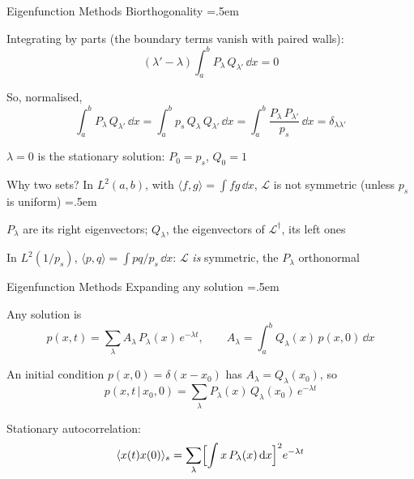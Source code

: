 \documentclass[xcolor={dvipsnames},t]{beamer}
\let\olditemize=\itemize
\let\endolditemize=\enditemize
\renewenvironment{itemize}{\olditemize \itemsep=.5em }{\endolditemize}
\newcommand{\gv}{\,|\,}
\newcommand{\Lop}{\mathcal{L}}
\begin{document}
\begin{frame}{Eigenfunction Methods}
    \alert{Biorthogonality}
    \begin{itemize}
        \item<2-> Integrating by parts (the boundary terms vanish with paired walls):
        \[ (\lambda'-\lambda)\int_a^b P_\lambda\,Q_{\lambda'}\,\dd x = 0 \]
        \item<3-> So, normalised,
        \[ \int_a^b P_\lambda\,Q_{\lambda'}\,\dd x = \int_a^b p_s\,Q_\lambda\,Q_{\lambda'}\,\dd x = \int_a^b \frac{P_\lambda\,P_{\lambda'}}{p_s}\,\dd x = \delta_{\lambda\lambda'} \]
        \item<4-> $\lambda=0$ is the stationary solution: $P_0=p_s$, $Q_0=1$
        \item<5-> Why two sets? In $L^2(a,b)$, with $\langle f,g\rangle=\int fg\,\dd x$, $\Lop$ is not symmetric (unless $p_s$ is uniform)
        \begin{itemize}
            \item<6-> $P_\lambda$ are its right eigenvectors; $Q_\lambda$, the eigenvectors of $\Lop^\dagger$, its left ones
        \end{itemize}
        \item<7-> In $L^2(1/p_s)$, $\langle p,q\rangle=\int pq/p_s\,\dd x$: $\Lop$ \textit{is} symmetric, the $P_\lambda$ orthonormal
    \end{itemize}
\end{frame}

\begin{frame}{Eigenfunction Methods}
    \alert{Expanding any solution}
    \begin{itemize}
        \item<2-> Any solution is
        \[ p(x,t) = \sum_\lambda A_\lambda\,P_\lambda(x)\,e^{-\lambda t},\qquad A_\lambda=\int_a^b Q_\lambda(x)\,p(x,0)\,\dd x \]
        \vspace{-1.5em}
        \item<3-> An initial condition $p(x,0) = \delta(x-x_0)$ has $A_\lambda=Q_\lambda(x_0)$, so
        \[ \boxed{\;p(x,t\gv x_0,0) = \sum_\lambda P_\lambda(x)\,Q_\lambda(x_0)\,e^{-\lambda t}\;} \]
        \vspace{-1.5em}
        \item<4-> Stationary autocorrelation:
        \[ \langle x(t)x(0)\rangle_s = \sum_\lambda\Bigl[\int x\,P_\lambda(x)\,\dd x\Bigr]^2 e^{-\lambda t} \]
    \end{itemize}
\end{frame}
\end{document}
